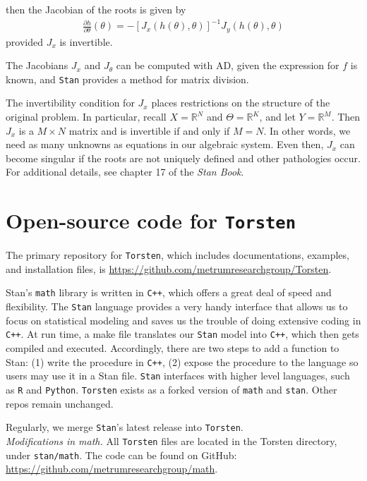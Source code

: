 \documentclass[11pt]{article}
\begin{document}
then the Jacobian of the roots is given by
%
\begin{eqnarray*}
\frac{\partial h}{\partial \theta}(\theta) = - [J_x(h(\theta), \theta)]^{-1} J_y(h(\theta), \theta)
\end{eqnarray*}
%
provided $J_x$ is invertible.

The Jacobians $J_x$ and $J_\theta$ can be computed with AD,
given the expression for $f$ is known, and \texttt{Stan} provides a method for matrix division. 

The invertibility condition for $J_x$ places restrictions on the structure of the
original problem. In particular, recall $X = \mathbb{R}^N$ and $\Theta = \mathbb{R}^K$,
and let $Y = \mathbb{R}^M$. Then $J_x$ is a $M \times N$ matrix and is invertible
if and only if $M = N$. In other words, we need as many unknowns as equations in our
algebraic system. Even then, $J_x$ can become singular if the roots are not uniquely
defined and other pathologies occur. For additional details, see chapter 17 of the \textit{Stan Book}.

\section{Open-source code for \texttt{Torsten}}

The primary repository for \texttt{Torsten}, which includes documentations, examples,
and installation files, is \url{https://github.com/metrumresearchgroup/Torsten}.

Stan's \texttt{math} library is written in \texttt{C++}, which offers a great deal of speed and 
flexibility. The \texttt{Stan} language provides a very handy interface that allows us to focus 
on statistical modeling and saves us the trouble of doing extensive coding in \texttt{C++}.
%
At run time, a make file translates our \texttt{Stan} model into \texttt{C++}, which then gets compiled 
and executed. Accordingly, there are two steps to add a function to Stan: (1) write the 
procedure in \texttt{C++}, (2) expose the procedure to the language so users may use it in a 
Stan file.
%
\texttt{Stan} interfaces with higher level languages, such as \texttt{R} and \texttt{Python}. 
\texttt{Torsten} exists as a forked 
version of \texttt{math} and \texttt{stan}. Other repos remain unchanged.

Regularly, we merge \texttt{Stan}'s latest release into \texttt{Torsten}. \\


\textit{Modifications in math.} All \texttt{Torsten} files are located in 
the Torsten directory, under \texttt{stan/math}. The
code can be found on GitHub: \\ \url{https://github.com/metrumresearchgroup/math}. \\
\end{document}
